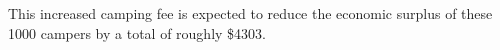 \documentclass[11pt,letterpaper]{article}\usepackage[]{graphicx}\usepackage[]{xcolor}
\begin{document}
\begin{enumerate}[label=\alph*., leftmargin=*]
\begin{enumerate}[label=\roman*.]
		This increased camping fee is expected to reduce the economic surplus of these 1000 campers by a total of roughly \$4303.
	\end{enumerate}
\end{enumerate}
\end{document}
